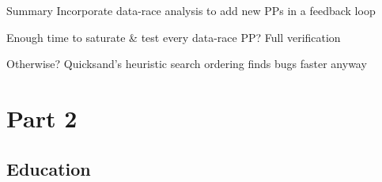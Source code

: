 \documentclass[xcolor=dvipsnames]{beamer}
\begin{document}
\begin{frame}{Summary}
	Incorporate data-race analysis to add new PPs in a feedback loop
	\linegap

	Enough time to saturate \& test every data-race PP? Full verification
	\linegap

	Otherwise? Quicksand's heuristic search ordering finds bugs faster anyway

\end{frame}


\section{Part 2}
\subsection{Education}

\end{document}
